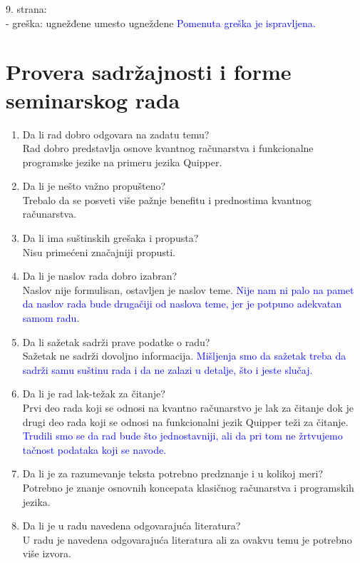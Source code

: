 \documentclass[a4paper]{report}
\newcommand{\odgovor}[1]{\textcolor{blue}{#1}}
\begin{document}
9. strana:\\
- greška: ugnežđene umesto ugneždene
\odgovor {Pomenuta greška je ispravljena.}


\section{Provera sadržajnosti i forme seminarskog rada}

\begin{enumerate}
\item Da li rad dobro odgovara na zadatu temu?\\
Rad dobro predstavlja osnove kvantnog računarstva i funkcionalne programske jezike na primeru jezika Quipper.
\item Da li je nešto važno propušteno?\\
Trebalo da se posveti više pažnje benefitu i prednostima kvantnog računarstva.
\item Da li ima suštinskih grešaka i propusta?\\
Nisu primećeni značajniji propusti.
\item Da li je naslov rada dobro izabran?\\
Naslov nije formulisan, ostavljen je naslov teme.
\odgovor {Nije nam ni palo na pamet da naslov rada bude drugačiji od naslova teme, jer je potpuno adekvatan samom radu.}
\item Da li sažetak sadrži prave podatke o radu?\\
Sažetak ne sadrži dovoljno informacija.
\odgovor {Mišljenja smo da sažetak treba da sadrži samu suštinu rada i da ne zalazi u detalje, što i jeste slučaj.}
\item Da li je rad lak-težak za čitanje?\\
Prvi deo rada koji se odnosi na kvantno računarstvo je lak za čitanje dok je drugi deo rada koji se odnosi na funkcionalni jezik Quipper teži za čitanje. 
\odgovor {Trudili smo se da rad bude što jednostavniji, ali da pri tom ne žrtvujemo tačnost podataka koji se navode.}
\item Da li je za razumevanje teksta potrebno predznanje i u kolikoj meri?\\
Potrebno je znanje osnovnih koncepata klasičnog računarstva i programskih jezika.
\item Da li je u radu navedena odgovarajuća literatura?\\
U radu je navedena odgovarajuća literatura ali za ovakvu temu je potrebno više izvora.

\end{enumerate}
\end{document}
